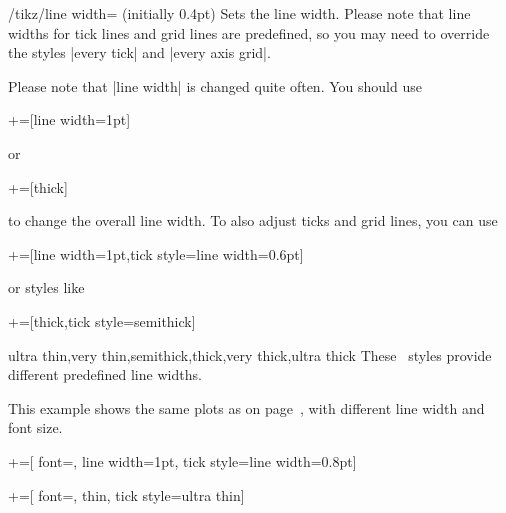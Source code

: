 \begin{key}{/tikz/line width= (initially 0.4pt)}
	Sets the line width. Please note that line widths for tick lines and grid lines are predefined, so you may need to override the styles |every tick| and |every axis grid|.

	Please note that |line width| is changed quite often. You should use
\begin{codeexample}
+=[line width=1pt]
\end{codeexample}
	or
\begin{codeexample}
+=[thick]
\end{codeexample}
	to change the overall line width. To also adjust ticks and grid lines, you can use
\begin{codeexample}
+=[line width=1pt,tick style={line width=0.6pt}]
\end{codeexample}
	or styles like
\begin{codeexample}
+=[thick,tick style={semithick}]
\end{codeexample}
\end{key}

\begin{keylist}[/tikz]{ultra thin,very thin,semithick,thick,very thick,ultra thick}
	These \Tikz\ styles provide different predefined line widths.
\end{keylist}

This example shows the same plots as on page~\pageref{page:plotcoords:src}, with different line width and font size.
\begin{codeexample}[]
+=[
	font=\large,
	line width=1pt,
	tick style={line width=0.8pt}]
\end{codeexample}

\begin{codeexample}[]
+=[
	font=\footnotesize,
	thin,
	tick style={ultra thin}]
\end{codeexample}

